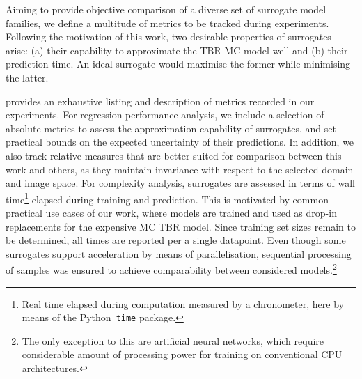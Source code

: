 Aiming to provide objective comparison of a diverse set of surrogate model
families, we define a multitude of metrics to be tracked during experiments.
Following the motivation of this work, two desirable properties of surrogates
arise: (a) their capability to approximate the TBR MC model well and (b) their
prediction time. An ideal surrogate would maximise
the former while minimising the latter.

 provides an exhaustive listing and description of metrics recorded
in our experiments. For regression performance analysis, we include a selection
of absolute metrics to assess the approximation capability of surrogates, and set
practical bounds on the expected uncertainty of their predictions. In addition, we also track
relative measures that are better-suited for comparison between this work and others, as
they maintain invariance with respect to the selected domain and image space.
For complexity analysis, surrogates are assessed in terms of wall
time\footnote{Real time elapsed during computation measured by a
chronometer, here by means of the Python~\texttt{time} package.}
elapsed during training and prediction. This is motivated by common practical use
cases of our work, where models are trained and used as drop-in replacements for the
expensive MC TBR model. Since training set sizes remain to be determined, all times are
reported per a single datapoint. Even though some surrogates support acceleration
by means of parallelisation, sequential processing of samples was ensured to
achieve comparability between considered
models.\footnote{The only exception to this are artificial neural networks,
	which require considerable amount of processing power for training on conventional CPU architectures.}

